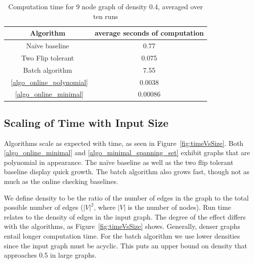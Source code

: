 \documentclass[sigplan,review,anonymous]{acmart}
\begin{document}
{\begin{table}
\begin{tabular}{|c|c|}
    \hline
    Algorithm & average seconds of computation \\
    \hline
    Na\"{i}ve baseline & 0.77 \\
    Two Flip tolerant & 0.075 \\
    Batch algorithm & 7.55 \\
    ~\ref{algo_online_polynomial} & 0.0038 \\
    ~\ref{algo_online_minimal} & 0.00086 \\
    \hline
\end{tabular}
\caption{Computation time for 9 node graph of density 0.4, averaged over ten runs}
\label{tab:times} %
\end{table}
    
\subsection{Scaling of Time with Input Size}


Algorithms scale as expected with time, as seen in Figure~\ref{fig:timeVsSize}.
Both \ref{algo_online_minimal} and \ref{algo_minimal_spanning_set} exhibit graphs that are polynomial in appearance.
The na\"{i}ve baseline as well as the two flip tolerant baseline display quick growth.
The batch algorithm also grows fast, though not as much as the online checking baselines.

We define density to be the ratio of the number of edges in the graph to the total possible number of edges ($|V|^2$, where $|V|$ is the number of nodes).
Run time relates to the density of edges in the input graph.
The degree of the effect differs with the algorithms, as Figure~\ref{fig:timeVsSize} shows.
Generally, denser graphs entail longer computation time.
For the batch algorithm we use lower densities since the input graph must be acyclic. This puts an upper bound on density that approaches 0.5 in large graphs.

}
\end{document}
